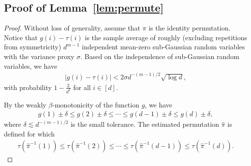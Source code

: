 \documentclass[12pt]{article}
\theoremstyle{definition}
\begin{document}
\subsection{Proof of Lemma~\ref{lem:permute}}
\begin{proof}
Without loss of generality, assume that $\pi$ is the identity permutation. 
Notice that $g(i)-\tau(i)$ is the sample average of roughly (excluding repetitions from symmetricity) $d^{m-1}$ independent mean-zero sub-Gaussian random variables with the variance proxy $\sigma$. Based on the independence of sub-Gaussian random variables, we have
\begin{align}\label{eq:concentration}
    |g(i)-\tau(i)| < 2\sigma d^{-(m-1)/2}\sqrt{\log d},
\end{align}
with probability $1-\frac{2}{d^2}$ for all $i\in[d]$. 

By the weakly $\beta$-monotonicity of the function $g$, we have
\begin{align}\label{eq:mon1}
    g(1)\pm \delta \leq g(2) \pm \delta  \leq \cdots \leq g(d-1)\pm \delta  \leq g(d)\pm \delta,
\end{align}
where $\delta\lesssim d^{-(m-1)/2}$ is the small tolerance. 
The estimated permutation $\hat\pi$ is defined for which
\begin{align}\label{eq:mon2}
    \tau(\hat\pi^{-1}(1))\leq\tau(\hat\pi^{-1}(2))\leq \cdots\leq \tau(\hat\pi^{-1}(d-1))\leq \tau(\hat\pi^{-1}(d)).
\end{align}


\end{proof}
\end{document}
